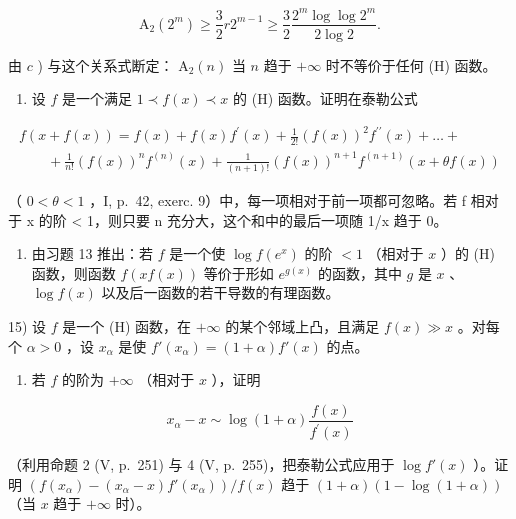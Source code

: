 \[
\mathrm{A} _ {2} (2 ^ {m}) \geqslant \frac {3}{2} r 2 ^ {m - 1} \geqslant \frac {3}{2} \frac {2 ^ {m} \log \log 2 ^ {m}}{2 \log 2}.
\]

由 \(c\) ) 与这个关系式断定： \(\mathrm{A}_2(n)\) 当 \(n\) 趋于 \(+\infty\) 时不等价于任何 (H) 函数。

\begin{enumerate}
\def\labelenumi{\arabic{enumi})}
\setcounter{enumi}{12}
\tightlist
\item
  设 \(f\) 是一个满足 \(1 \prec f(x) \prec x\) 的 (H) 函数。证明在泰勒公式
\end{enumerate}

\[
\begin{array}{l} f (x + f (x)) = f (x) + f (x) f ^ {\prime} (x) + \frac {1}{2 !} (f (x)) ^ {2} f ^ {\prime \prime} (x) + \dots + \\ \qquad + \frac {1}{n !} (f (x)) ^ {n} f ^ {(n)} (x) + \frac {1}{(n + 1) !} (f (x)) ^ {n + 1} f ^ {(n + 1)} (x + \theta f (x)) \end{array}
\]

（ \(0 < \theta < 1\) ，I, p.~42, exerc. 9）中，每一项相对于前一项都可忽略。若 f 相对于 x 的阶 \textless{} 1，则只要 n 充分大，这个和中的最后一项随 1/x 趋于 0。

\begin{enumerate}
\def\labelenumi{\arabic{enumi})}
\setcounter{enumi}{13}
\tightlist
\item
  由习题 13 推出：若 \(f\) 是一个使 \(\log f(e^x)\) 的阶 \(< 1\) （相对于 \(x\) ）的 (H) 函数，则函数 \(f(xf(x))\) 等价于形如 \(e^{g(x)}\) 的函数，其中 \(g\) 是 \(x\) 、 \(\log f(x)\) 以及后一函数的若干导数的有理函数。
\end{enumerate}

15) 设 \(f\) 是一个 (H) 函数，在 \(+\infty\) 的某个邻域上凸，且满足 \(f(x) \gg x\) 。对每个 \(\alpha > 0\) ，设 \(x_{\alpha}\) 是使 \(f'(x_{\alpha}) = (1 + \alpha)f'(x)\) 的点。

\begin{enumerate}
\def\labelenumi{\alph{enumi})}
\tightlist
\item
  若 \(f\) 的阶为 \(+\infty\) （相对于 \(x\) ），证明
\end{enumerate}

\[
x _ {\alpha} - x \sim \log (1 + \alpha) \frac {f (x)}{f ^ {\prime} (x)}
\]

（利用命题 2 (V, p.~251) 与 4 (V, p.~255)，把泰勒公式应用于 \(\log f'(x)\) ）。证明 \(\left(f(x_{\alpha}) - (x_{\alpha} - x)f'(x_{\alpha})\right)/f(x)\) 趋于 \((1 + \alpha)\left(1 - \log(1 + \alpha)\right)\) （当 \(x\) 趋于 \(+\infty\) 时）。

